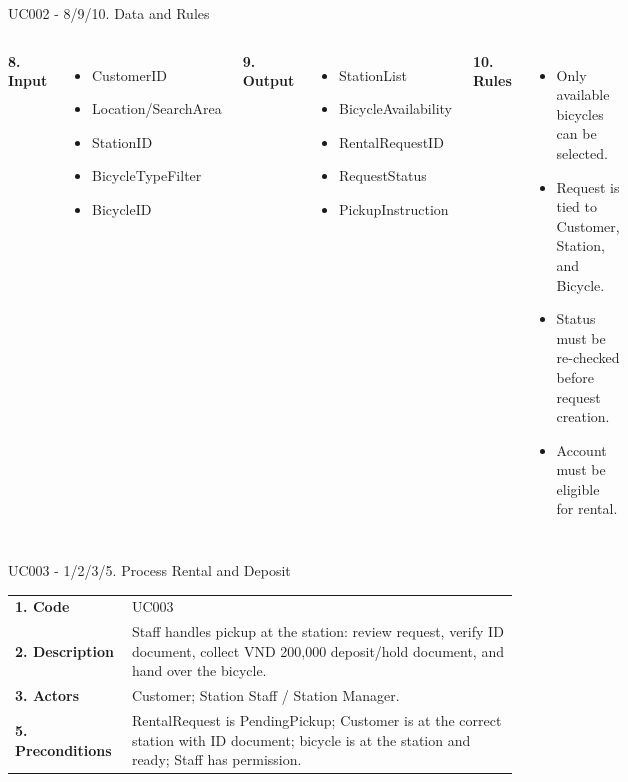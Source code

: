 \documentclass[aspectratio=169,10pt]{beamer}
\newcommand{\tightitems}{\setlength{\itemsep}{2pt}\setlength{\parskip}{0pt}}
\begin{document}
\begin{frame}{UC002 - 8/9/10. Data and Rules}
\footnotesize
\begin{columns}[T,onlytextwidth]
\textbf{8. Input}
\begin{itemize}\tightitems
  \item CustomerID
  \item Location/SearchArea
  \item StationID
  \item BicycleTypeFilter
  \item BicycleID
\end{itemize}
\textbf{9. Output}
\begin{itemize}\tightitems
  \item StationList
  \item BicycleAvailability
  \item RentalRequestID
  \item RequestStatus
  \item PickupInstruction
\end{itemize}
\textbf{10. Rules}
\begin{itemize}\tightitems
  \item Only available bicycles can be selected.
  \item Request is tied to Customer, Station, and Bicycle.
  \item Status must be re-checked before request creation.
  \item Account must be eligible for rental.
\end{itemize}
\end{columns}
\end{frame}

\begin{frame}{UC003 - 1/2/3/5. Process Rental and Deposit}
\small
\begin{tabular}{p{}p{}}
\toprule
\textbf{1. Code} & UC003 \\
\textbf{2. Description} & Staff handles pickup at the station: review request, verify ID document, collect VND 200,000 deposit/hold document, and hand over the bicycle. \\
\textbf{3. Actors} & Customer; Station Staff / Station Manager. \\
\textbf{5. Preconditions} & RentalRequest is PendingPickup; Customer is at the correct station with ID document; bicycle is at the station and ready; Staff has permission. \\
\bottomrule
\end{tabular}
\end{frame}
\end{document}
